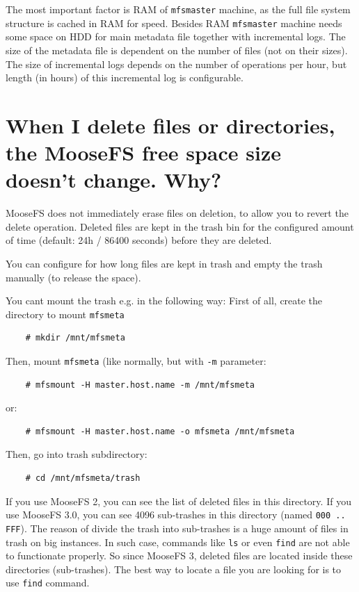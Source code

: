 \documentclass[a4paper,11pt,english]{report}
\def\code#1{\texttt{#1}}
\begin{document}
		The most important factor is RAM of \code{mfsmaster} machine, as the full file system structure is cached in RAM for speed. Besides RAM \code{mfsmaster} machine needs some space on HDD for main metadata file together with incremental logs.  
		The size of the metadata file is dependent on the number of files (not on their sizes). The size of incremental logs depends on the number of operations per hour, but length (in hours) of this incremental log is configurable.
		
		\section{When I delete files or directories, the MooseFS free space size doesn't change. Why?}
		MooseFS does not immediately erase files on deletion, to allow you to revert the delete operation. Deleted files are kept in the trash bin for the configured amount of time (default: 24h / 86400 seconds) before they are deleted.  
		
		You can configure for how long files are kept in trash and empty the trash manually (to release the space).
		
		You cant mount the trash e.g. in the following way:
		First of all, create the directory to mount \code{mfsmeta}
		\begin{lstlisting}
	# mkdir /mnt/mfsmeta
		\end{lstlisting}
		
		Then, mount \code{mfsmeta} (like normally, but with \code{-m} parameter:
		\begin{lstlisting}
	# mfsmount -H master.host.name -m /mnt/mfsmeta
		\end{lstlisting}
		or:
		\begin{lstlisting}
	# mfsmount -H master.host.name -o mfsmeta /mnt/mfsmeta
		\end{lstlisting}
		
		Then, go into trash subdirectory:
		\begin{lstlisting}
	# cd /mnt/mfsmeta/trash
		\end{lstlisting}
		
		If you use MooseFS 2, you can see the list of deleted files in this directory. If you use MooseFS 3.0, you can see 4096 sub-trashes in this directory (named \code{000 .. FFF}). The reason of divide the trash into sub-trashes is a huge amount of files in trash on big instances. In such case, commands like \code{ls} or even \code{find} are not able to functionate properly. So since MooseFS 3, deleted files are located inside these directories (sub-trashes). The best way to locate a file you are looking for is to use \code{find} command.
		
\end{document}
